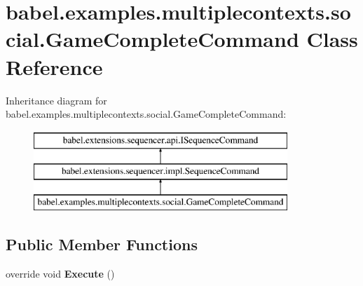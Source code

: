 \hypertarget{classbabel_1_1examples_1_1multiplecontexts_1_1social_1_1_game_complete_command}{\section{babel.\-examples.\-multiplecontexts.\-social.\-Game\-Complete\-Command Class Reference}
\label{classbabel_1_1examples_1_1multiplecontexts_1_1social_1_1_game_complete_command}
}
Inheritance diagram for babel.\-examples.\-multiplecontexts.\-social.\-Game\-Complete\-Command\-:\begin{figure}[H]
\begin{center}
\leavevmode
\includegraphics[height=3.000000cm]{classbabel_1_1examples_1_1multiplecontexts_1_1social_1_1_game_complete_command}
\end{center}
\end{figure}
\subsection*{Public Member Functions}
\begin{DoxyCompactItemize}
\item 
\hypertarget{classbabel_1_1examples_1_1multiplecontexts_1_1social_1_1_game_complete_command_a8d57db79fd40b42964429b6c3292c1ba}{override void {\bfseries Execute} ()}\label{classbabel_1_1examples_1_1multiplecontexts_1_1social_1_1_game_complete_command_a8d57db79fd40b42964429b6c3292c1ba}

\end{DoxyCompactItemize}
